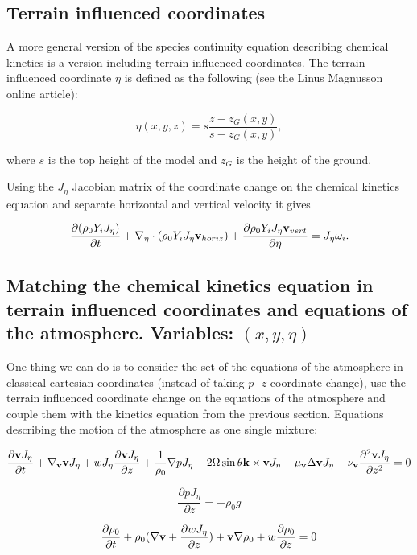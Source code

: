 \documentclass{article}
\begin{document}
\subsection{Terrain influenced coordinates}

A more general version of the species continuity equation describing chemical kinetics is a version including terrain-influenced coordinates.
The terrain-influenced coordinate $\eta$ is defined as the following (see the Linus Magnusson online article):

\[ \eta (x,y,z) = s \frac{z-z_G (x,y)}{s - z_G(x,y)},\]

where $s$ is the top height of the model and $z_G$ is the height of the ground.

Using the $J_{\eta}$ Jacobian matrix of the coordinate change on the chemical kinetics equation and separate horizontal and vertical velocity it gives

\[ \frac{\partial(\rho_0 Y_i J_{\eta})}{\partial t} + \nabla_{\eta} \cdot (\rho_0 Y_i J_{\eta} \bold{v}_{horiz}) + \frac{\partial \rho_0 Y_i J_{\eta} \bold{v}_{vert}}{\partial \eta} = J_{\eta} \omega_i. \]

\subsection{Matching the chemical kinetics equation in terrain influenced coordinates and equations of the atmosphere. Variables: $(x,y,\eta)$}

One thing we can do is to consider the set of the equations of the atmosphere in classical cartesian coordinates (instead of taking $p$- $z$ coordinate change), use the terrain influenced coordinate change on the equations of the atmosphere and couple them with the kinetics equation from the previous section.
\newline
\newline
Equations describing the motion of the atmosphere as one single mixture:

\[ \frac{\partial \bold{v} J_{\eta}}{\partial t} + \nabla_{\bold{v}}\bold{v} J_{\eta} + w J_{\eta} \frac{\partial \bold{v} J_{\eta}}{\partial z} + \frac{1}{\rho_0}\nabla p J_{\eta}+ 2 \Omega \sin \theta \bold{k} \times \bold{v} J_{\eta} -\mu_{\bold{v}}\Delta \bold{v} J_{\eta} -\nu_{\bold{v}} \frac{\partial ^ 2 \bold{v} J_{\eta}}{\partial z^2} = 0  \]

\[ \frac{\partial p J_{\eta}}{\partial z} = - \rho_0 g \]

\[ \frac{\partial \rho_0}{\partial t} + \rho_0 (\nabla \bold{v} + \frac{\partial w J_{\eta}}{\partial z}) + \bold{v} \nabla \rho_0 + w \frac{\partial \rho_0}{\partial z} = 0 \]
\end{document}

